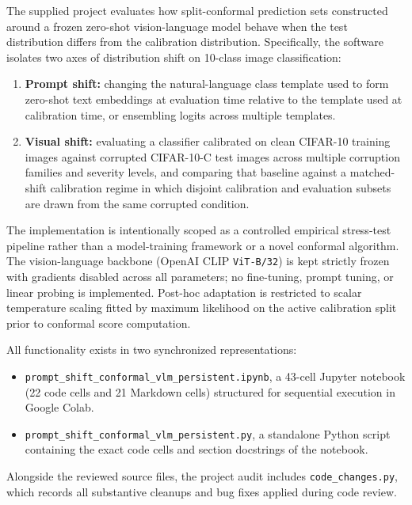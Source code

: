 \documentclass[11pt,a4paper]{article}
\begin{document}
The supplied project evaluates how split-conformal prediction sets constructed around a frozen zero-shot vision-language model behave when the test distribution differs from the calibration distribution. Specifically, the software isolates two axes of distribution shift on 10-class image classification:
\begin{enumerate}
  \item \textbf{Prompt shift:} changing the natural-language class template used to form zero-shot text embeddings at evaluation time relative to the template used at calibration time, or ensembling logits across multiple templates.
  \item \textbf{Visual shift:} evaluating a classifier calibrated on clean CIFAR-10 training images against corrupted CIFAR-10-C test images across multiple corruption families and severity levels, and comparing that baseline against a matched-shift calibration regime in which disjoint calibration and evaluation subsets are drawn from the same corrupted condition.
\end{enumerate}

The implementation is intentionally scoped as a controlled empirical stress-test pipeline rather than a model-training framework or a novel conformal algorithm. The vision-language backbone (OpenAI CLIP \texttt{ViT-B/\allowbreak{}32}) is kept strictly frozen with gradients disabled across all parameters; no fine-tuning, prompt tuning, or linear probing is implemented. Post-hoc adaptation is restricted to scalar temperature scaling fitted by maximum likelihood on the active calibration split prior to conformal score computation.

All functionality exists in two synchronized representations:
\begin{itemize}
  \item \texttt{prompt\_\allowbreak{}shift\_\allowbreak{}conformal\_\allowbreak{}vlm\_\allowbreak{}persistent.ipynb}, a 43-cell Jupyter notebook (22 code cells and 21 Markdown cells) structured for sequential execution in Google Colab.
  \item \texttt{prompt\_\allowbreak{}shift\_\allowbreak{}conformal\_\allowbreak{}vlm\_\allowbreak{}persistent.py}, a standalone Python script containing the exact code cells and section docstrings of the notebook.
\end{itemize}
Alongside the reviewed source files, the project audit includes \texttt{code\_\allowbreak{}changes.py}, which records all substantive cleanups and bug fixes applied during code review.
\end{document}
